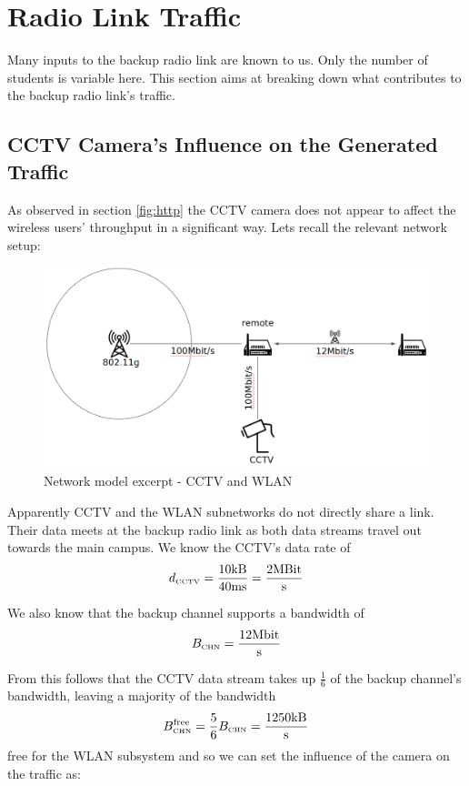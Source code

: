 \documentclass[a4paper]{scrreprt}
\begin{document}
		\section{Radio Link Traffic}
		Many inputs to the backup radio link are known to us. Only the number of students is variable here. This section aims at breaking down what contributes to the backup radio link's traffic.
		
			\subsection{CCTV Camera's Influence on the Generated Traffic}\label{sec:cctvinfluence}
			As observed in section \ref{fig:http} the CCTV camera does not appear to affect the wireless users' throughput in a significant way. Lets recall the relevant network setup:
			
			\begin{figure}[H]
				\center\includegraphics[width=\textwidth]{./simmodel_cctv_vs_wlan.png}
				\caption{Network model excerpt - CCTV and WLAN}
			\end{figure}
			
			Apparently CCTV and the WLAN subnetworks do not directly share a link. Their data meets at the backup radio link as both data streams travel out towards the main campus. We know the CCTV's data rate of  
			\[d_\text{\tiny CCTV}=\frac{10\text{kB}}{40\text{ms}}=\frac{2\text{MBit}}{\text{s}}\]
			
			We also know that the backup channel supports a bandwidth of \[B_\text{\tiny CHN}=\frac{12\text{Mbit}}{\text{s}}\]
			
			From this follows that the CCTV data stream takes up $\frac{1}{6}$ of the backup channel's bandwidth, leaving a majority of the bandwidth \[B_\text{\tiny CHN}^\text{free}=\frac{5}{6} B_\text{\tiny CHN}=\frac{1250\text{kB}}{\text{s}}\] free for the WLAN subsystem and so we can set the influence of the camera on the traffic as:
			
\end{document}
